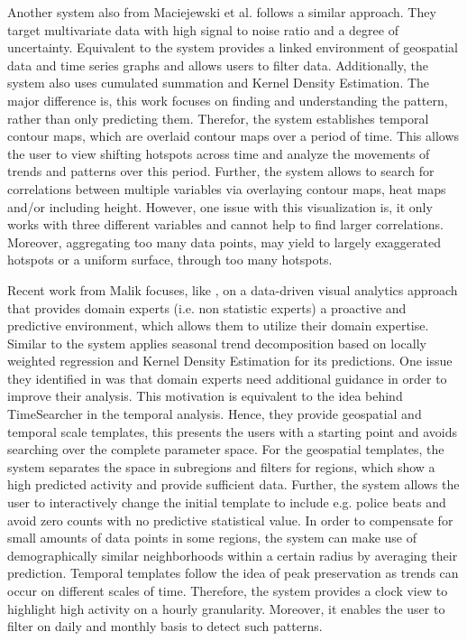 \documentclass[electronic]{vgtc}             %
\begin{document}
Another system also from Maciejewski et al. \cite{maciejewski:2010} follows a similar approach.
They target multivariate data with high signal to noise ratio and a degree of uncertainty.
Equivalent to \cite{maciejewski:2011} the system provides a linked environment of geospatial data and time series graphs and allows users to filter data.
Additionally, the system also uses cumulated summation and Kernel Density Estimation. 
The major difference is, this work focuses on finding and understanding the pattern, rather than only predicting them. 
Therefor, the system establishes temporal contour maps, which are overlaid contour maps over a period of time. 
This allows the user to view shifting hotspots across time and analyze the movements of trends and patterns over this period.
Further, the system allows to search for correlations between multiple variables via overlaying contour maps, heat maps and/or including height. 
However, one issue with this visualization is, it only works with three different variables and cannot help to find larger correlations. 
Moreover, aggregating too many data points, may yield to largely exaggerated hotspots or a uniform surface, through too many hotspots. 

Recent work from Malik \cite{malik:2014} focuses, like \cite{Hochheiser:2004, buono:2007, buono:2005, Xie:2014}, on a data-driven visual analytics approach that provides domain experts (i.e. non statistic experts) a proactive and predictive environment, which allows them to utilize their domain expertise.
Similar to \cite{maciejewski:2011} the system applies seasonal trend decomposition based on locally weighted regression and Kernel Density Estimation for its predictions.
One issue they identified in \cite{maciejewski:2011} was that domain experts need additional guidance in order to improve their analysis.
This motivation is equivalent to the idea behind TimeSearcher \cite{Hochheiser:2004, buono:2007, buono:2005} in the temporal analysis.
Hence, they provide geospatial and temporal scale templates, this presents the users with a starting point and avoids searching over the complete parameter space.
For the geospatial templates, the system separates the space in subregions and filters for regions, which show a high predicted activity and provide sufficient data. 
Further, the system allows the user to interactively change the initial template to include e.g. police beats and avoid zero counts with no predictive statistical value.
In order to compensate for small amounts of data points in some regions, the system can make use of demographically similar neighborhoods within a certain radius by averaging their prediction. 
Temporal templates follow the idea of peak preservation as trends can occur on different scales of time. 
Therefore, the system provides a clock view to highlight high activity on a hourly granularity.
Moreover, it enables the user to filter on daily and monthly basis to detect such patterns.
\end{document}
